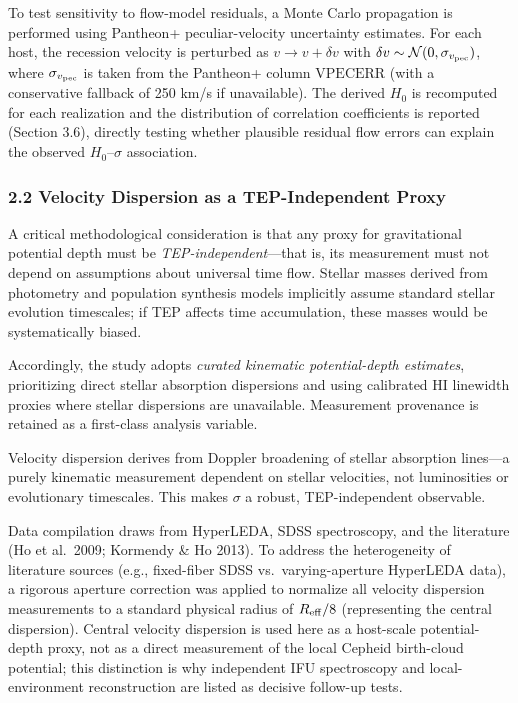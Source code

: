 \documentclass[
]{article}
\begin{document}
To test sensitivity to flow-model residuals, a Monte Carlo propagation
is performed using Pantheon+ peculiar-velocity uncertainty estimates.
For each host, the recession velocity is perturbed as
\(v \rightarrow v + \delta v\) with
\(\delta v \sim \mathcal{N}(0,\sigma_{v_{\rm pec}})\), where
\(\sigma_{v_{\rm pec}}\) is taken from the Pantheon+ column
\(\mathrm{VPECERR}\) (with a conservative fallback of 250 km/s if
unavailable). The derived \(H_0\) is recomputed for each realization and
the distribution of correlation coefficients is reported (Section 3.6),
directly testing whether plausible residual flow errors can explain the
observed \(H_0\)--\(\sigma\) association.

\subsubsection{2.2 Velocity Dispersion as a TEP-Independent
Proxy}\label{velocity-dispersion-as-a-tep-independent-proxy}

A critical methodological consideration is that any proxy for
gravitational potential depth must be \emph{TEP-independent}---that is,
its measurement must not depend on assumptions about universal time
flow. Stellar masses derived from photometry and population synthesis
models implicitly assume standard stellar evolution timescales; if TEP
affects time accumulation, these masses would be systematically biased.

Accordingly, the study adopts \emph{curated kinematic potential-depth
estimates}, prioritizing direct stellar absorption dispersions and using
calibrated HI linewidth proxies where stellar dispersions are
unavailable. Measurement provenance is retained as a first-class
analysis variable.

Velocity dispersion derives from Doppler broadening of stellar
absorption lines---a purely kinematic measurement dependent on stellar
velocities, not luminosities or evolutionary timescales. This makes
\(\sigma\) a robust, TEP-independent observable.

Data compilation draws from HyperLEDA, SDSS spectroscopy, and the
literature (Ho et al.~2009; Kormendy \& Ho 2013). To address the
heterogeneity of literature sources (e.g., fixed-fiber SDSS
vs.~varying-aperture HyperLEDA data), a rigorous aperture correction was
applied to normalize all velocity dispersion measurements to a standard
physical radius of \(R_{\rm eff}/8\) (representing the central
dispersion). Central velocity dispersion is used here as a host-scale
potential-depth proxy, not as a direct measurement of the local Cepheid
birth-cloud potential; this distinction is why independent IFU
spectroscopy and local-environment reconstruction are listed as decisive
follow-up tests.
\end{document}

